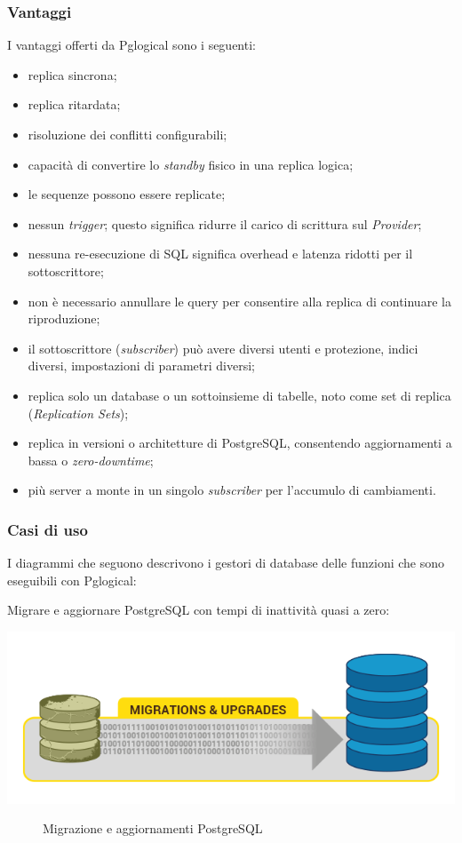 \subsubsection{Vantaggi}
I vantaggi offerti da Pglogical sono i seguenti:
\begin{itemize}
\item
replica sincrona;
\item
replica ritardata;
\item
risoluzione dei conflitti configurabili;
\item
capacit\`{a} di convertire lo \textit{standby} fisico in una replica logica;
\item
le sequenze possono essere replicate;
\item
nessun \textit{trigger}; questo significa ridurre il carico di scrittura sul \textit{Provider};
\item
nessuna re-esecuzione di SQL significa overhead e latenza ridotti per il sottoscrittore;
\item
non \`{e} necessario annullare le query per consentire alla replica di continuare la riproduzione;
\item
il sottoscrittore (\textit{subscriber}) pu\`{o} avere diversi utenti e protezione, indici diversi, impostazioni di parametri diversi;
\item
replica solo un database o un sottoinsieme di tabelle, noto come set di replica (\textit{Replication Sets});
\item
replica in versioni o architetture di PostgreSQL, consentendo aggiornamenti a bassa o \textit{zero-downtime};
\item
pi\`{u} server a monte in un singolo \textit{subscriber} per l'accumulo di cambiamenti.\cite{etichetta3}
\end{itemize}

\subsubsection{Casi di uso}
I diagrammi che seguono descrivono i gestori di database delle funzioni che sono eseguibili con Pglogical:

Migrare e aggiornare PostgreSQL con tempi di inattivit\`{a} quasi a zero: 

\begin{center}
\includegraphics[scale=0.60]{img/pglogical_1.png}\\
\end{center}
\begin{figure}[htbp]
\caption{Migrazione e aggiornamenti PostgreSQL \label{figura1} \cite{etichetta3}}
\end{figure}

